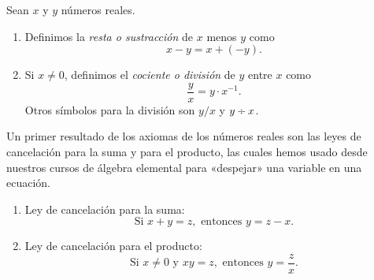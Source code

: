 \documentclass[12pt,a4paper]{book}
\newcommand{\entre}{\mathbin{\text{\textdiv}}}
\begin{document}
    \begin{definicion}\label{def:8}\label{def:resta-division}
        Sean $x$ y $y$ números reales.
        \begin{enumerate}
            \item Definimos la \textit{resta o sustracción} de $x$ menos $y$ como
            \begin{equation*}
                x-y=x+(-y).
            \end{equation*}
            \item Si $x\neq 0$, definimos el \textit{cociente o división} de $y$ entre $x$ como
            \begin{equation*}
                \frac{y}{x}=y\cdot x^{-1}.
            \end{equation*}
            Otros símbolos para la división son $y/x$ y $y\entre x$.
        \end{enumerate}
    \end{definicion}

    Un primer resultado de los axiomas de los números reales son las leyes de
    cancelación para la suma y para el producto, las cuales hemos usado desde
    nuestros cursos de álgebra elemental para «despejar» una variable en una
    ecuación.

    \begin{proposicion}\label{prop:4}
        \begin{enumerate}
            \item Ley de cancelación para la suma:
            \begin{equation*}
                \text{Si }x+y=z,\text{ entonces }y=z-x.
            \end{equation*}
            \item Ley de cancelación para el producto:
            \begin{equation*}
                \text{Si }x\neq 0\text{ y }xy=z,\text{ entonces }y=\frac{z}{x}.
            \end{equation*}
        \end{enumerate}
    \end{proposicion}
\end{document}
